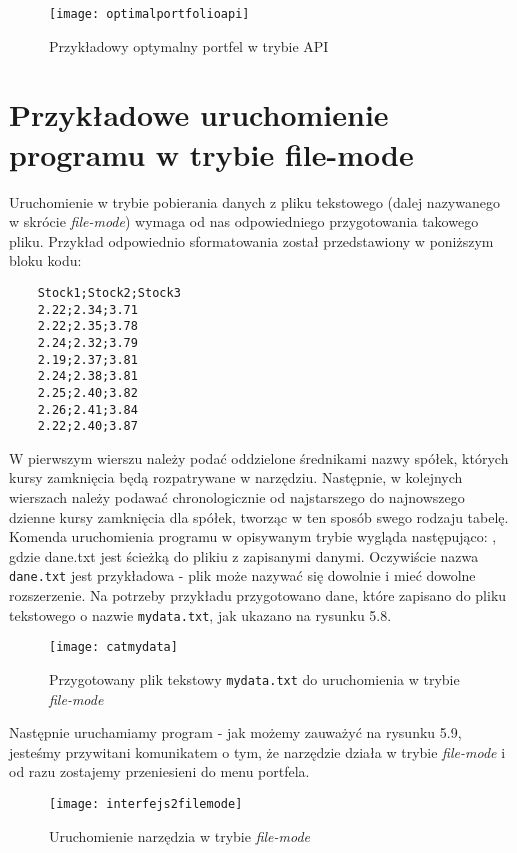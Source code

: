 \documentclass[magister]{dyplom}
\def\code#1{\texttt{#1}}
\begin{document}
\begin{figure}[ht]
	\centering
	\texttt{[image: optimalportfolioapi]}
	\caption{Przykładowy optymalny portfel w trybie API}
\end{figure}
\newpage

\section{Przykładowe uruchomienie programu w trybie file-mode}

Uruchomienie w trybie pobierania danych z pliku tekstowego (dalej nazywanego w skrócie \textit{file-mode}) wymaga od nas odpowiedniego przygotowania takowego pliku. Przykład odpowiednio sformatowania został przedstawiony w poniższym bloku kodu:
\begin{verbatim}
	Stock1;Stock2;Stock3
	2.22;2.34;3.71
	2.22;2.35;3.78
	2.24;2.32;3.79
	2.19;2.37;3.81
	2.24;2.38;3.81
	2.25;2.40;3.82
	2.26;2.41;3.84
	2.22;2.40;3.87
\end{verbatim}
W pierwszym wierszu należy podać oddzielone średnikami nazwy spółek, których kursy zamknięcia będą rozpatrywane w narzędziu. Następnie, w kolejnych wierszach należy podawać chronologicznie od najstarszego do najnowszego dzienne kursy zamknięcia dla spółek, tworząc w ten sposób swego rodzaju tabelę. Komenda uruchomienia programu w opisywanym trybie wygląda następująco:
,
gdzie dane.txt jest ścieżką do plikiu z zapisanymi danymi. Oczywiście nazwa \code{dane.txt} jest przykładowa - plik może nazywać się dowolnie i mieć dowolne rozszerzenie.
Na potrzeby przykładu przygotowano dane, które zapisano do pliku tekstowego o nazwie \code{mydata.txt}, jak ukazano na rysunku 5.8. 

\begin{figure}[ht]
	\centering
	\texttt{[image: catmydata]}
	\caption{Przygotowany plik tekstowy \code{mydata.txt} do uruchomienia w trybie \textit{file-mode}}
\end{figure}

Następnie uruchamiamy program - jak możemy zauważyć na rysunku 5.9, jesteśmy przywitani komunikatem o tym, że narzędzie działa w trybie \textit{file-mode} i od razu zostajemy przeniesieni do menu portfela.

\begin{figure}[ht]
	\centering
	\texttt{[image: interfejs2filemode]}
	\caption{Uruchomienie narzędzia w trybie \textit{file-mode}}
\end{figure}
\end{document}
